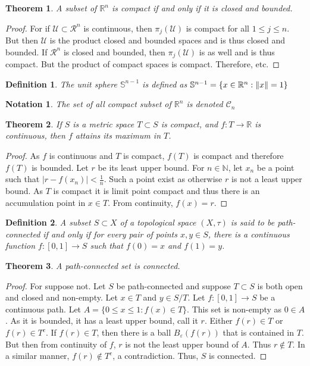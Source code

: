 \documentclass[12pt,oneside]{book}
\theoremstyle{mystyle}
\newtheorem{theorem}{Theorem}[section]
\newtheorem{definition}{Definition}[section]
\newtheorem{notation}{Notation}[section]
\begin{document}
\begin{theorem}
A subset of $\mathbb{R}^n$ is compact if and only if it is closed and bounded.
\end{theorem}
\begin{proof}
For if $\mathcal{U}\subset \mathcal{R}^n$ is continuous, then $\pi_{j}(\mathcal{U})$ is compact for all $1\leq j \leq n$. But then $\mathcal{U}$ is the product closed and bounded spaces and is thus closed and bounded. If $\mathcal{R}^n$ is closed and bounded, then $\pi_j(\mathcal{U})$ is as well and is thus compact. But the product of compact spaces is compact. Therefore, etc.
\end{proof}
\begin{definition}
The unit sphere $\mathbb{S}^{n-1}$ is defined as $\mathbb{S}^{n-1} = \{x\in \mathbb{R}^n: \norm{x}=1\}$
\end{definition}

\begin{notation}
The set of all compact subset of $\mathbb{R}^n$ is denoted $\mathscr{C}_n$
\end{notation}

\begin{theorem}
If $S$ is a metric space $T\subset S$ is compact, and $f:T\rightarrow \mathbb{R}$ is continuous, then $f$ attains its maximum in $T$.
\end{theorem}
\begin{proof}
As $f$ is continuous and $T$ is compact, $f(T)$ is compact and therefore $f(T)$ is bounded. Let $r$ be its least upper bound. For $n\in \mathbb{N}$, let $x_n$ be a point such that $|r-f(x_n)|< \frac{1}{n}$. Such a point exist as otherwise $r$ is not a least upper bound. As $T$ is compact it is limit point compact and thus there is an accumulation point in $x\in T$. From continuity, $f(x) = r$.
\end{proof}

\begin{definition}
A subset $S\subset X$ of a topological space $(X,\tau)$ is said to be path-connected if and only if for every pair of points $x,y\in S$, there is a continuous function $f:[0,1]\rightarrow S$ such that $f(0)=x$ and $f(1)=y$.
\end{definition}

\begin{theorem}
A path-connected set is connected.
\end{theorem}
\begin{proof}
For suppose not. Let $S$ be path-connected and suppose $T\subset S$ is both open and closed and non-empty. Let $x\in T$ and $y\in S/T$. Let $f:[0,1]\rightarrow S$ be a continuous path. Let $A =\{0\leq x \leq 1: f(x) \in T\}$. This set is non-empty as $0\in A$. As it is bounded, it has a least upper bound, call it $r$. Either $f(r)\in T$ or $f(r)\in T^c$. If $f(r)\in T$, then there is a ball $B_{\varepsilon}(f(r))$ that is contained in $T$. But then from continuity of $f$, $r$ is not the least upper bound of $A$. Thus $r\notin T$. In a similar manner, $f(r)\notin T^c$, a contradiction. Thus, $S$ is connected.
\end{proof}
%
\end{document}
